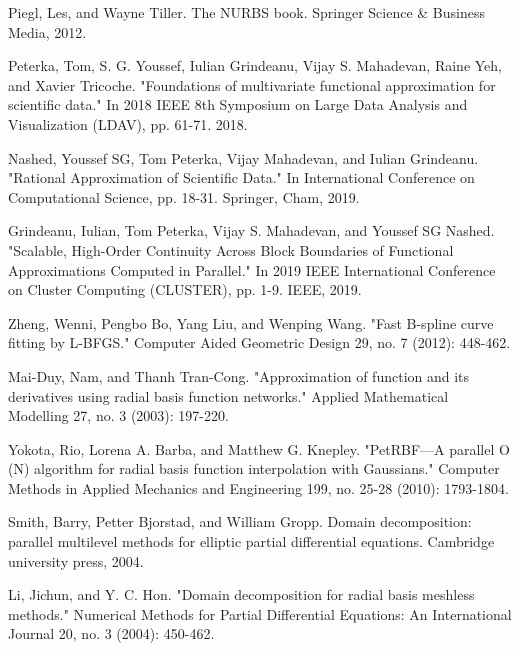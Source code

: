 \documentclass[conference]{IEEEtran}
\begin{document}
\begin{thebibliography}{00}

 Piegl, Les, and Wayne Tiller. The NURBS book. Springer Science \& Business Media, 2012.

 Peterka, Tom, S. G. Youssef, Iulian Grindeanu, Vijay S. Mahadevan, Raine Yeh, and Xavier Tricoche. "Foundations of multivariate functional approximation for scientific data." In 2018 IEEE 8th Symposium on Large Data Analysis and Visualization (LDAV), pp. 61-71. 2018.

 Nashed, Youssef SG, Tom Peterka, Vijay Mahadevan, and Iulian Grindeanu. "Rational Approximation of Scientific Data." In International Conference on Computational Science, pp. 18-31. Springer, Cham, 2019.

 Grindeanu, Iulian, Tom Peterka, Vijay S. Mahadevan, and Youssef SG Nashed. "Scalable, High-Order Continuity Across Block Boundaries of Functional Approximations Computed in Parallel." In 2019 IEEE International Conference on Cluster Computing (CLUSTER), pp. 1-9. IEEE, 2019.


 Zheng, Wenni, Pengbo Bo, Yang Liu, and Wenping Wang. "Fast B-spline curve fitting by L-BFGS." Computer Aided Geometric Design 29, no. 7 (2012): 448-462.

 Mai-Duy, Nam, and Thanh Tran-Cong. "Approximation of function and its derivatives using radial basis function networks." Applied Mathematical Modelling 27, no. 3 (2003): 197-220.

 Yokota, Rio, Lorena A. Barba, and Matthew G. Knepley. "PetRBF—A parallel O (N) algorithm for radial basis function interpolation with Gaussians." Computer Methods in Applied Mechanics and Engineering 199, no. 25-28 (2010): 1793-1804.

 Smith, Barry, Petter Bjorstad, and William Gropp. Domain decomposition: parallel multilevel methods for elliptic partial differential equations. Cambridge university press, 2004.

 Li, Jichun, and Y. C. Hon. "Domain decomposition for radial basis meshless methods." Numerical Methods for Partial Differential Equations: An International Journal 20, no. 3 (2004): 450-462.


\end{thebibliography}
\end{document}
